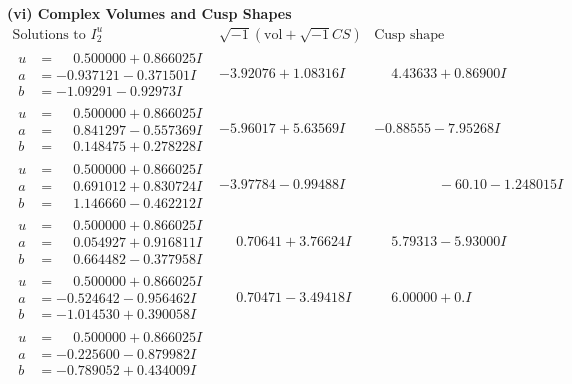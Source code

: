 \documentclass[1p]{elsarticle_modified}
\theoremstyle{definition}
\newcommand{\I}{\sqrt{-1}}
\begin{document}
\newpage\flushleft \textbf{(vi) Complex Volumes and Cusp Shapes}
$$\begin{array}{c|c|c}  
\text{Solutions to }I^u_{2}& \I (\text{vol} + \sqrt{-1}CS) & \text{Cusp shape}\\
 \hline 
\begin{aligned}
u &= \phantom{-}0.500000 + 0.866025 I \\
a &= -0.937121 - 0.371501 I \\
b &= -1.09291 - 0.92973 I\end{aligned}
 & -3.92076 + 1.08316 I & \phantom{-}4.43633 + 0.86900 I \\ \hline\begin{aligned}
u &= \phantom{-}0.500000 + 0.866025 I \\
a &= \phantom{-}0.841297 - 0.557369 I \\
b &= \phantom{-}0.148475 + 0.278228 I\end{aligned}
 & -5.96017 + 5.63569 I & -0.88555 - 7.95268 I \\ \hline\begin{aligned}
u &= \phantom{-}0.500000 + 0.866025 I \\
a &= \phantom{-}0.691012 + 0.830724 I \\
b &= \phantom{-}1.146660 - 0.462212 I\end{aligned}
 & -3.97784 - 0.99488 I & \phantom{-0.000000 }      -6
0. 10   - 1.248015 I \\ \hline\begin{aligned}
u &= \phantom{-}0.500000 + 0.866025 I \\
a &= \phantom{-}0.054927 + 0.916811 I \\
b &= \phantom{-}0.664482 - 0.377958 I\end{aligned}
 & \phantom{-}0.70641 + 3.76624 I & \phantom{-}5.79313 - 5.93000 I \\ \hline\begin{aligned}
u &= \phantom{-}0.500000 + 0.866025 I \\
a &= -0.524642 - 0.956462 I \\
b &= -1.014530 + 0.390058 I\end{aligned}
 & \phantom{-}0.70471 - 3.49418 I & \phantom{-}6.00000 + 0. I\phantom{ +0.000000I} \\ \hline\begin{aligned}
u &= \phantom{-}0.500000 + 0.866025 I \\
a &= -0.225600 - 0.879982 I \\
b &= -0.789052 + 0.434009 I\end{aligned}

\end{array}$$
\end{document}
